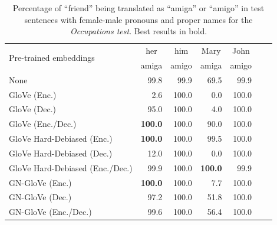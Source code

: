 \documentclass[11pt,a4paper]{article}
\begin{document}
\begin{table}[h!]
\centering
\begin{tabular}{lrrrrrr}  
\toprule
\multirow{2}{*}{Pre-trained embeddings} & 
\multicolumn{1}{c}{her} &
\multicolumn{1}{c}{him} &
\multicolumn{1}{c}{Mary} &
\multicolumn{1}{c}{John} \\
& amiga  &  amigo 
& amiga  & amigo \\
\midrule
None & 99.8  & 99.9 & 69.5  & 99.9 \\ 
GloVe (Enc.) & 2.6  & 100.0 & 0.0 & 100.0 \\
GloVe (Dec.) & 95.0  & 100.0 & 4.0 & 100.0 \\
GloVe (Enc./Dec.)& \textbf{100.0} & 100.0 & 90.0 & 100.0 \\ 
GloVe Hard-Debiased (Enc.) & \textbf{100.0} & 100.0 & 99.5 & 100.0 \\ 
GloVe Hard-Debiased (Dec.) & 12.0  & 100.0 & 0.0 & 100.0 \\
GloVe Hard-Debiased (Enc./Dec.) & 99.9 & 	100.0 & \textbf{100.0}  & 99.9 \\ 
GN-GloVe (Enc.) & \textbf{100.0} & 100.0 & 7.7 & 100.0 \\ 
GN-GloVe (Dec.) & 97.2 & 100.0 & 51.8 & 100.0 \\
GN-GloVe (Enc./Dec.) & 99.6  & 100.0 & 56.4 & 100.0 \\ 
\bottomrule
\end{tabular}
\caption{Percentage of ``friend'' being translated as ``amiga'' or ``amigo'' in test sentences with female-male pronouns and proper names for the \textit{Occupations test}. 
Best results in bold.}
\label{tab:her-him} 
\end{table}
\end{document}
